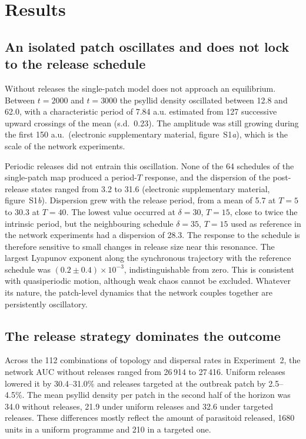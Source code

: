 \section{Results}
\label{sec:results}

\subsection{An isolated patch oscillates and does not lock to the release schedule}
\label{sec:res-intrinsic}

Without releases the single-patch model does not approach an equilibrium. Between $t = 2000$ and $t = 3000$ the psyllid density oscillated between 12.8 and 62.0, with a characteristic period of 7.84 a.u. estimated from 127 successive upward crossings of the mean (s.d.\ 0.23). The amplitude was still growing during the first 150 a.u.\ (electronic supplementary material, figure~S1\emph{a}), which is the scale of the network experiments.

Periodic releases did not entrain this oscillation. None of the 64 schedules of the single-patch map produced a period-$T$ response, and the dispersion of the post-release states ranged from 3.2 to 31.6 (electronic supplementary material, figure~S1\emph{b}). Dispersion grew with the release period, from a mean of 5.7 at $T = 5$ to 30.3 at $T = 40$. The lowest value occurred at $\delta = 30$, $T = 15$, close to twice the intrinsic period, but the neighbouring schedule $\delta = 35$, $T = 15$ used as reference in the network experiments had a dispersion of 28.3. The response to the schedule is therefore sensitive to small changes in release size near this resonance. The largest Lyapunov exponent along the synchronous trajectory with the reference schedule was $(0.2 \pm 0.4)\times10^{-3}$, indistinguishable from zero. This is consistent with quasiperiodic motion, although weak chaos cannot be excluded. Whatever its nature, the patch-level dynamics that the network couples together are persistently oscillatory.

\subsection{The release strategy dominates the outcome}
\label{sec:res-strategy}

Across the 112 combinations of topology and dispersal rates in Experiment~2, the network AUC without releases ranged from 26\,914 to 27\,416. Uniform releases lowered it by 30.4--31.0\% and releases targeted at the outbreak patch by 2.5--4.5\%. The mean psyllid density per patch in the second half of the horizon was 34.0 without releases, 21.9 under uniform releases and 32.6 under targeted releases. These differences mostly reflect the amount of parasitoid released, 1680 units in a uniform programme and 210 in a targeted one.

